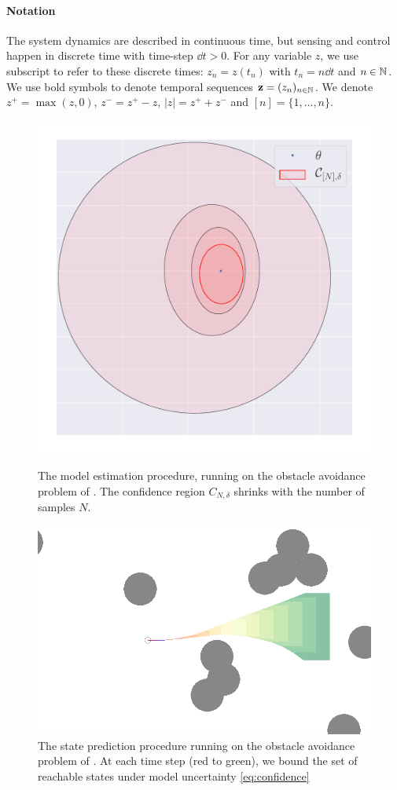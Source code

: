 \documentclass{article}
\begin{document}
\paragraph{Notation}

The system dynamics are described in continuous time, but sensing and control happen in discrete time with time-step $\dd t>0$. For any variable $z$, we use subscript to refer to these discrete times: $z_n = z(t_n)$ with $t_n = n\dd t$ and $n\in\mathbb{N}$. We use bold symbols to denote temporal sequences $\mathbf{z} = (z_n)_{n\in\mathbb{N}}$. We denote $z^+ = \max(z,0)$, $z^- = z^+-z$, $|z| = z^++z^-$ and $[n]=\{1,\dots, n\}$.

\begin{figure}
	\begin{minipage}[b]{0.49\linewidth}
		\centering
		\includegraphics[trim={1cm 0 0 0}, clip, width=0.6\linewidth]{img/ellipsoid}
		\caption{The model estimation procedure, running on the obstacle avoidance problem of . The confidence region $C_{N,\delta}$ shrinks with the number of samples $N$.}
		\label{fig:estimation}
	\end{minipage}
	\hfill
	\begin{minipage}[b]{0.49\linewidth}
		\centering
		\includegraphics[trim={4cm 0 0 0}, clip, width=0.8\linewidth]{img/obstacle_small}
		\caption{The state prediction procedure running on the obstacle avoidance problem of . At each time step (red to green), we bound the set of reachable states under model uncertainty \eqref{eq:confidence}}
		\label{fig:prediction}
	\end{minipage}%
\end{figure}
\end{document}
